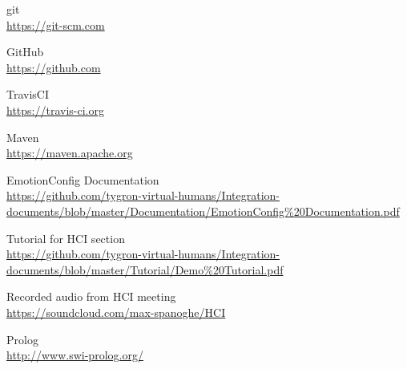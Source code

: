 \documentclass[11pt]{article}
\begin{document}
\begin{thebibliography}{9}
	git\\
	\url{https://git-scm.com}
	
	GitHub\\
	\url{https://github.com}
	
	TravisCI\\
	\url{https://travis-ci.org}
	
	Maven\\
	\url{https://maven.apache.org}
	
	EmotionConfig Documentation\\
	\url{https://github.com/tygron-virtual-humans/Integration-documents/blob/master/Documentation/EmotionConfig\%20Documentation.pdf}
		
	Tutorial for HCI section\\
	\url{https://github.com/tygron-virtual-humans/Integration-documents/blob/master/Tutorial/Demo\%20Tutorial.pdf}
	
	Recorded audio from HCI meeting\\
	\url{https://soundcloud.com/max-spanoghe/HCI}
	
	Prolog\\
	\url{http://www.swi-prolog.org/}


	
\end{thebibliography}
\end{document}
